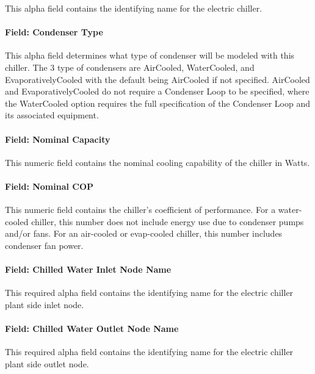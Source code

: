 This alpha field contains the identifying name for the electric chiller.

\paragraph{Field: Condenser Type}\label{field-condenser-type-1-001}

This alpha field determines what type of condenser will be modeled with this chiller. The 3 type of condensers are AirCooled, WaterCooled, and EvaporativelyCooled with the default being AirCooled if not specified. AirCooled and EvaporativelyCooled do not require a Condenser Loop to be specified, where the WaterCooled option requires the full specification of the Condenser Loop and its associated equipment.

\paragraph{Field: Nominal Capacity}\label{field-nominal-capacity-3}

This numeric field contains the nominal cooling capability of the chiller in Watts.

\paragraph{Field: Nominal COP}\label{field-nominal-cop-1}

This numeric field contains the chiller's coefficient of performance. For a water-cooled chiller, this number does not include energy use due to condenser pumps and/or fans. For an air-cooled or evap-cooled chiller, this number includes condenser fan power.

\paragraph{Field: Chilled Water Inlet Node Name}\label{field-chilled-water-inlet-node-name-3}

This required alpha field contains the identifying name for the electric chiller plant side inlet node.

\paragraph{Field: Chilled Water Outlet Node Name}\label{field-chilled-water-outlet-node-name-3}

This required alpha field contains the identifying name for the electric chiller plant side outlet node.

